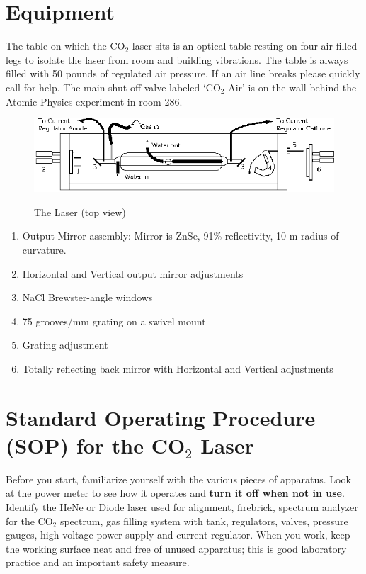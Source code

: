 \documentclass{../lab}
\begin{document}
\section{Equipment}

The table on which the CO$_2$ laser sits is an optical table resting on four air-filled legs to isolate the laser from room and building vibrations. The table is always filled with 50 pounds of regulated air pressure. If an air line breaks please quickly call for help. The main shut-off valve labeled `CO$_2$ Air' is on the wall behind the Atomic Physics experiment in room 286.

\begin{figure}[h]
    \centering
    \href{http://experimentationlab.berkeley.edu/sites/default/files/images/CO23.gif}{\includegraphics[width=0.7\linewidth]{images/CO23.png}}
    \caption{The Laser (top view)}
    \label{fig:TheLaserTopView}
\end{figure}

\begin{enumerate}
    \item Output-Mirror assembly: Mirror is ZnSe, 91\% reflectivity, 10 m radius of curvature.

    \item Horizontal and Vertical output mirror adjustments
    
    \item NaCl Brewster-angle windows
    
    \item 75 grooves/mm grating on a swivel mount
    
    \item Grating adjustment
    
    \item Totally reflecting back mirror with Horizontal and Vertical adjustments
\end{enumerate}

\section{Standard Operating Procedure (SOP) for the CO\texorpdfstring{$_2$}{2} Laser}

Before you start, familiarize yourself with the various pieces of apparatus. Look at the power meter to see how it operates and \textbf{turn it off when not in use}. Identify the HeNe or Diode laser used for alignment, firebrick, spectrum analyzer for the CO$_2$ spectrum, gas filling system with tank, regulators, valves, pressure gauges, high-voltage power supply and current regulator. When you work, keep the working surface neat and free of unused apparatus; this is good laboratory practice and an important safety measure.
\end{document}
